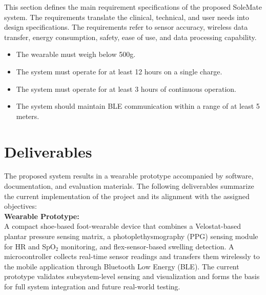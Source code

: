 This section defines the main requirement specifications of the proposed SoleMate system. The requirements translate the clinical, technical, and user needs into design specifications. The requirements refer to sensor accuracy, wireless data transfer, energy consumption, safety, ease of use, and data processing capability.\\
\begin{itemize}
    \item The wearable must weigh below 500g. 
    \item The system must operate for at least 12 hours on a single charge. 
    \item The system must operate for at least 3 hours of continuous operation.
    \item The system should maintain BLE communication within a range of at least 5 meters.

\end{itemize}

\section{Deliverables}

The proposed system results in a wearable prototype accompanied by software, documentation, and evaluation materials. The following deliverables summarize the current implementation of the project and its alignment with the assigned objectives:\\

\textbf{Wearable Prototype:}\\
A compact shoe-based foot-wearable device that combines a Velostat-based plantar pressure sensing matrix, a photoplethysmography (PPG) sensing module for HR and SpO$_2$ monitoring, and flex-sensor-based swelling detection. A microcontroller collects real-time sensor readings and transfers them wirelessly to the mobile application through Bluetooth Low Energy (BLE). The current prototype validates subsystem-level sensing and visualization and forms the basis for full system integration and future real-world testing.\\

